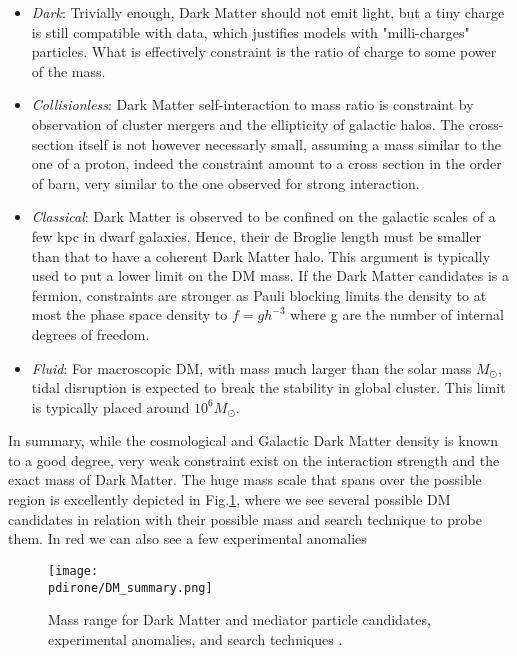 \begin{itemize}
\item \textit{Dark}: Trivially enough, Dark Matter should not emit light, but a tiny charge is still compatible with data, which justifies models with "milli-charges" particles. What is effectively constraint is the ratio of charge to some power of the mass.
\item \textit{Collisionless}: Dark Matter self-interaction to mass ratio is constraint by observation of cluster mergers and the ellipticity of galactic halos. The cross-section itself is not however necessarly small, assuming a mass similar to the one of a proton, indeed the constraint amount to a cross section in the order of barn, very similar to the one observed for strong interaction.
\item \textit{Classical}: Dark Matter is observed to be confined on the galactic scales of a few kpc in dwarf galaxies. Hence, their de Broglie length must be smaller than that to have a coherent Dark Matter halo. This argument is typically used to put a lower limit on the DM mass. If the Dark Matter candidates is a fermion, constraints are stronger as Pauli blocking limits the density to at most the phase space density to $f=gh^{-3}$ where g are the number of internal degrees of freedom.
\item \textit{Fluid}: For macroscopic DM, with mass much larger than the solar mass $M_{\odot}$, tidal disruption is expected to break the stability  in global cluster. This limit is typically placed around $10^6 M_{\odot}$.
\end{itemize}

In summary, while the cosmological and Galactic Dark Matter density is known to a good degree, very weak constraint exist on the interaction strength and the exact mass of Dark Matter. The huge mass scale that spans over the possible region is excellently depicted in Fig.\ref{fig:dm-mass-range}, where we see several possible DM candidates in relation with their possible mass and search technique to probe them. In red we can also see a few experimental anomalies

\begin{figure}[bht!]
  \centering
  \texttt{[image: \\pdirone/DM\_summary.png]}
  \caption[Mass range for Dark Matter]{Mass range for Dark Matter and mediator particle candidates, experimental anomalies, and search techniques \cite{battaglieri2017cosmic}.}
  \label{fig:dm-mass-range}
\end{figure}

